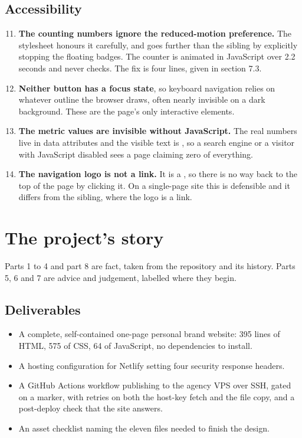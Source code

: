 \documentclass[11pt,a4paper]{article}
\begin{document}
\subsection{Accessibility}

\begin{enumerate}\setcounter{enumi}{10}
\item \textbf{The counting numbers ignore the reduced-motion preference.} The
  stylesheet honours it carefully, and goes further than the sibling by explicitly
  stopping the floating badges. The counter is animated in JavaScript over 2.2
  seconds and never checks. The fix is four lines, given in section 7.3.
\item \textbf{Neither button has a focus state}, so keyboard navigation relies on
  whatever outline the browser draws, often nearly invisible on a dark background.
  These are the page's only interactive elements.
\item \textbf{The metric values are invisible without JavaScript.} The real
  numbers live in data attributes and the visible text is , so a search
  engine or a visitor with JavaScript disabled sees a page claiming zero of
  everything.
\item \textbf{The navigation logo is not a link.} It is a , so
  there is no way back to the top of the page by clicking it. On a single-page
  site this is defensible and it differs from the sibling, where the logo is a
  link.
\end{enumerate}

\section{The project's story}

Parts 1 to 4 and part 8 are fact, taken from the repository and its history. Parts
5, 6 and 7 are advice and judgement, labelled where they begin.

\subsection{Deliverables}

\begin{itemize}
\item A complete, self-contained one-page personal brand website: 395 lines of
  HTML, 575 of CSS, 64 of JavaScript, no dependencies to install.
\item A hosting configuration for Netlify setting four security response headers.
\item A GitHub Actions workflow publishing to the agency VPS over SSH, gated on a
  \code{[deploy]} marker, with retries on both the host-key fetch and the file
  copy, and a post-deploy check that the site answers.
\item An asset checklist naming the eleven files needed to finish the design.
\end{itemize}
\end{document}
